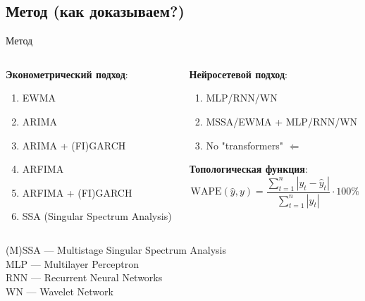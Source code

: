 \documentclass[11pt, aspectratio= 169]{beamer}
\begin{document}
	
	\subsection{Метод (как доказываем?)}
	\begin{frame}{Метод}
		\begin{columns}
			\begin{column}{0.5\textwidth}
				\textbf{Эконометрический подход}:
				\begin{center}
					\begin{enumerate}
						\item EWMA
						\item ARIMA
						\item ARIMA + (FI)GARCH
						\item ARFIMA
						\item ARFIMA + (FI)GARCH
						\item SSA (Singular Spectrum Analysis)
					\end{enumerate}
				\end{center}
			\end{column}
			\hfill
			\begin{column}{0.5\textwidth}
				\textbf{Нейросетевой подход}:
				\begin{center}
					\begin{enumerate}
						\item MLP/RNN/WN
						\item MSSA/EWMA + MLP/RNN/WN
						\item No "transformers" $\Leftarrow$ \cite{zeng2022transformers}
					\end{enumerate}
				\end{center}
				\textbf{Топологическая функция}:
				\begin{equation}
					\text{WAPE}(\hat{y}, y) = \frac{\sum_{t= 1}^n |y_t - \hat{y}_t|}{\sum_{t= 1}^n |y_t|} \cdot 100\%
				\end{equation}
			\end{column}
		\end{columns}
		\vspace{1cm}
		(M)SSA --- Multistage Singular Spectrum Analysis \cite{kuang2020efficient}\\
		MLP --- Multilayer Perceptron \cite{rosenblatt1961principles}\\
		RNN --- Recurrent Neural Networks \cite{hochreiter1997long}\\
		WN --- Wavelet Network \cite{alexandridis2014wavelet}
	\end{frame}
	
\end{document}
